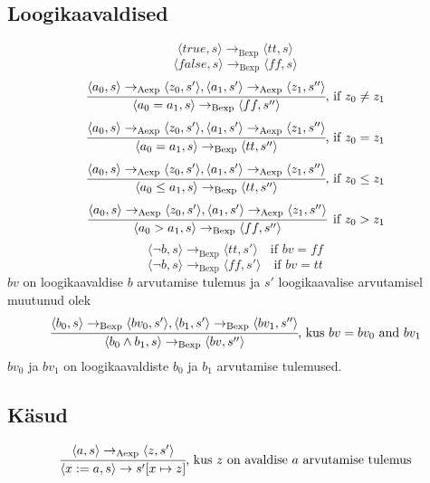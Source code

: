 \subsection{Loogikaavaldised}
\[
\langle true, s \rangle \rightarrow _\mathrm{Bexp} \langle tt, s \rangle
\]
\[
\langle false, s \rangle \rightarrow _\mathrm{Bexp} \langle ff, s \rangle
\]
\[
  \cfrac{
    \langle a_0, s \rangle \rightarrow _\mathrm{Aexp} \langle z_0, s' \rangle
    , 
    \langle a_1, s' \rangle \rightarrow _\mathrm{Aexp} \langle z_1, s'' \rangle
  }{
    \langle a_0 = a_1, s \rangle \rightarrow _\mathrm{Bexp} \langle ff, s'' \rangle
  }
  \text{,\ if\ } z_0 \neq  z_1
\]
\[
  \cfrac{
    \langle a_0, s \rangle \rightarrow _\mathrm{Aexp} \langle z_0, s' \rangle
    , 
    \langle a_1, s' \rangle \rightarrow _\mathrm{Aexp} \langle z_1, s'' \rangle
  }{
    \langle a_0 = a_1, s \rangle \rightarrow _\mathrm{Bexp} \langle tt, s'' \rangle
  }
  \text{,\ if\ } z_0 =  z_1
\]
\[
  \cfrac{
    \langle a_0, s \rangle \rightarrow _\mathrm{Aexp} \langle z_0, s' \rangle
    , 
    \langle a_1, s' \rangle \rightarrow _\mathrm{Aexp} \langle z_1, s'' \rangle
  }{
    \langle a_0 \leq a_1, s \rangle \rightarrow _\mathrm{Bexp} \langle tt, s'' \rangle
  }
  \text{,\ if\ } z_0 \leq z_1
\]
\[
  \cfrac{
    \langle a_0, s \rangle \rightarrow _\mathrm{Aexp} \langle z_0, s' \rangle
    , 
    \langle a_1, s' \rangle \rightarrow _\mathrm{Aexp} \langle z_1, s'' \rangle
  }{
    \langle a_0 > a_1, s \rangle \rightarrow _\mathrm{Bexp} \langle ff, s'' \rangle
  }
  \text{\, if\ } z_0 > z_1
\]
\[
  \langle \neg b, s \rangle \rightarrow _\mathrm{Bexp} \langle tt, s' \rangle
  \quad
  \text{if\ } bv = ff
\]
\[
  \langle \neg b, s \rangle \rightarrow _\mathrm{Bexp} \langle ff, s' \rangle
  \quad
  \text{if\ } bv = tt
\]
  \(bv\) on loogikaavaldise \(b\) arvutamise tulemus ja \(s'\) loogikaavalise
  arvutamisel muutunud olek
\[
  \cfrac{
    \langle b_0, s \rangle \rightarrow _\mathrm{Bexp} \langle bv_0, s' \rangle
    , 
    \langle b_1, s' \rangle \rightarrow _\mathrm{Bexp} \langle bv_1, s'' \rangle
  }{
    \langle b_0 \wedge  b_1, s \rangle \rightarrow _\mathrm{Bexp} \langle bv, s'' \rangle
  }
  \text{,\ kus\ } bv = bv_0 \text{\ and\ } bv_1
\]
  \(bv_0\) ja \(bv_1\) on loogikaavaldiste \(b_0\) ja \(b_1\) arvutamise tulemused.

\subsection{Käsud}
\[
  \cfrac{
    \langle a, s \rangle \rightarrow _\mathrm{Aexp} \langle z, s' \rangle
  }{
    \langle x:=a, s \rangle \rightarrow s'[x \mapsto z]
  }
  \text{,\ kus\ } z \text{\ on\ avaldise\ } a \text{\ arvutamise\ tulemus}
\]

